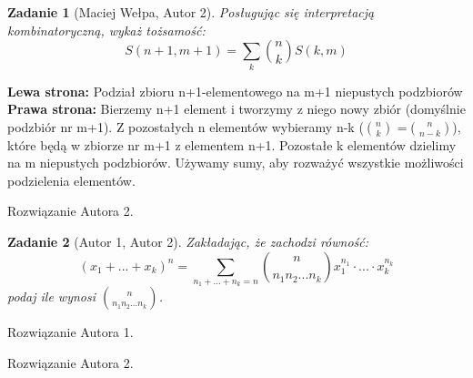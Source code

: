 \documentclass{mwart}
\newtheorem{zad}{Zadanie}[section]
\begin{document}
\begin{zad}[Maciej Wełpa, Autor 2]
    Posługując się interpretacją kombinatoryczną, wykaż tożsamość:
    \[S(n+1,m+1) = \sum_k \binom{n}{k}S(k,m)\]
\end{zad}
\begin{mdframed}
    \textbf{Lewa strona:} Podział zbioru n+1-elementowego na m+1 niepustych podzbiorów\\
    \textbf{Prawa strona:} Bierzemy n+1 element i tworzymy z niego nowy zbiór (domyślnie podzbiór nr m+1). Z pozostałych 
    n elementów wybieramy n-k (\(\binom{n}{k}\) =\(\binom{n}{n-k}\)), które będą w zbiorze nr m+1 z elementem n+1. Pozostałe k elementów dzielimy na m niepustych podzbiorów. Używamy sumy, aby rozważyć wszystkie możliwości podzielenia elementów.
\end{mdframed}
\begin{mdframed}
    Rozwiązanie Autora 2.
\end{mdframed}




\begin{zad}[Autor 1, Autor 2]
    Zakładając, że zachodzi równość:
    \[
        (x_1 + ... + x_k)^n = \sum_{n_1+...+n_k=n}\binom{n}{n_1 n_2 ... n_k}x_1^{n_1}\cdot...\cdot x_k^{n_k}
    \]
    podaj ile wynosi $\binom{n}{n_1 n_2 ... n_k}$.
\end{zad}
\begin{mdframed}
    Rozwiązanie Autora 1.
\end{mdframed}
\begin{mdframed}
    Rozwiązanie Autora 2.
\end{mdframed}
\end{document}

